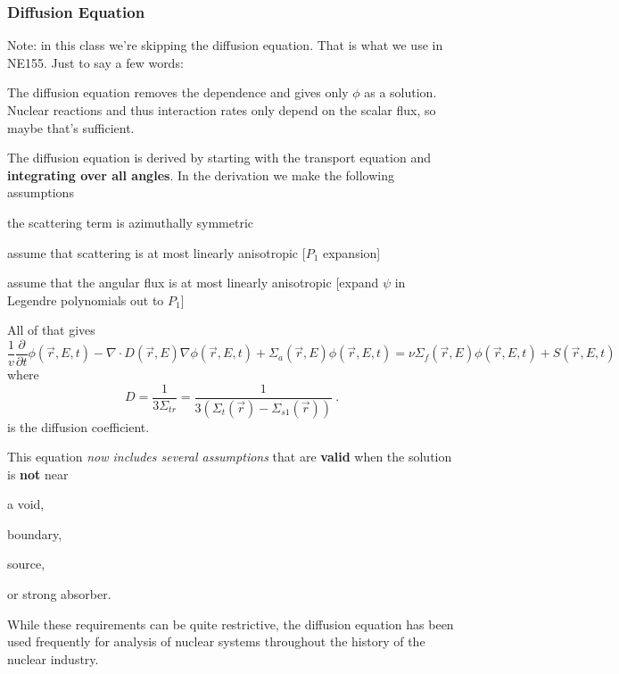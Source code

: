 \documentclass[12pt]{article}
\newcommand{\Macro}{\ensuremath{\Sigma}}
\begin{document}
\subsubsection*{Diffusion Equation}
Note: in this class we're skipping the diffusion equation. That is what we use in NE155. Just to say a few words:

The diffusion equation removes the dependence and gives only $\phi$ as a solution. Nuclear reactions and thus interaction rates only depend on the scalar flux, so maybe that's sufficient.

The diffusion equation is derived by starting with the transport equation and \textbf{integrating over all angles}. In the derivation we make the following assumptions
\begin{compactitem}
\item the scattering term is azimuthally symmetric
\item assume that scattering is at most linearly anisotropic [$P_1$ expansion]
\item assume that the angular flux is at most linearly anisotropic [expand $\psi$ in Legendre polynomials out to $P_1$]
\end{compactitem} 
All of that gives
\begin{equation}
\boxed{\frac{1}{v}\frac{\partial}{\partial t}\phi(\vec{r}, E, t) 
-\nabla \cdot D(\vec{r}, E)\nabla \phi(\vec{r}, E, t) + 
\Sigma_a(\vec{r},E) \phi(\vec{r}, E, t) =
\nu \Sigma_f(\vec{r},E) \phi(\vec{r}, E, t) +
S(\vec{r}, E, t)} \nonumber
\end{equation}
where
\[D = \frac{1}{3\Macro_{tr}} = \frac{1}{3(\Macro_t(\vec{r}) - \Macro_{s1}(\vec{r}))}\:.\] 
is the diffusion coefficient. 

This equation \textit{now includes several assumptions} that are \textbf{valid} when the solution is \textbf{not} near
%
\begin{compactitem}
\item a void, 
\item boundary, 
\item source, 
\item or strong absorber.
\end{compactitem} 
%
While these requirements can be quite restrictive, the diffusion equation has been used frequently for analysis of nuclear systems throughout the history of the nuclear industry.
\end{document}
